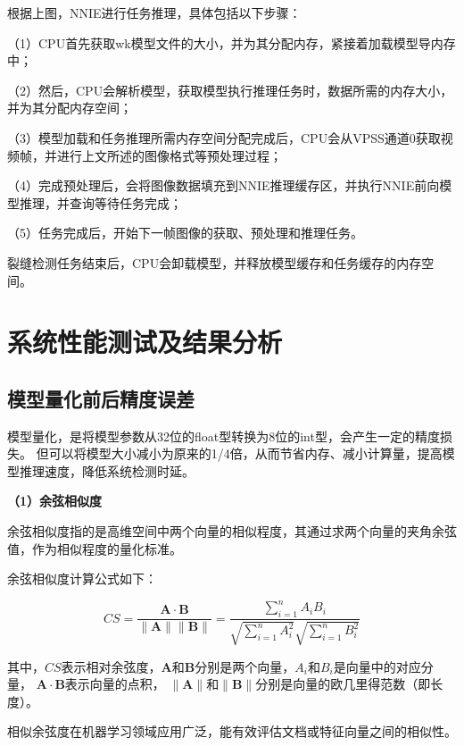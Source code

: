 根据上图，NNIE进行任务推理，具体包括以下步骤：

（1）CPU首先获取wk模型文件的大小，并为其分配内存，紧接着加载模型导内存中；

（2）然后，CPU会解析模型，获取模型执行推理任务时，数据所需的内存大小，并为其分配内存空间；

（3）模型加载和任务推理所需内存空间分配完成后，CPU会从VPSS通道0获取视频帧，并进行上文所述的图像格式等预处理过程；

（4）完成预处理后，会将图像数据填充到NNIE推理缓存区，并执行NNIE前向模型推理，并查询等待任务完成；

（5）任务完成后，开始下一帧图像的获取、预处理和推理任务。

裂缝检测任务结束后，CPU会卸载模型，并释放模型缓存和任务缓存的内存空间。


\section{系统性能测试及结果分析}

\subsection{模型量化前后精度误差}

模型量化，是将模型参数从32位的float型转换为8位的int型，会产生一定的精度损失。
但可以将模型大小减小为原来的1/4倍，从而节省内存、减小计算量，提高模型推理速度，降低系统检测时延。

\textbf{（1）余弦相似度}

余弦相似度指的是高维空间中两个向量的相似程度，其通过求两个向量的夹角余弦值，作为相似程度的量化标准。

余弦相似度计算公式如下：

\begin{equation}
    CS =  \frac{\mathbf{A} \cdot \mathbf{B}}{\|\mathbf{A}\|\|\mathbf{B}\|}  =  \frac{\sum_{i  = 1}^{n} A_{i} B_{i}}{\sqrt{\sum_{i = 1}^{n} A_{i}^{2}} \sqrt{\sum_{i =  1}^{n} B_{i}^{2}}}
\end{equation}

其中，$CS$表示相对余弦度，$\mathbf{A}$和$\mathbf{B}$分别是两个向量，$A_i$和$B_i$是向量中的对应分量，
$\mathbf{A} \cdot \mathbf{B}$表示向量的点积，
$\|\mathbf{A}\|$和$\|\mathbf{B}\|$分别是向量的欧几里得范数（即长度）。

相似余弦度在机器学习领域应用广泛，能有效评估文档或特征向量之间的相似性。

